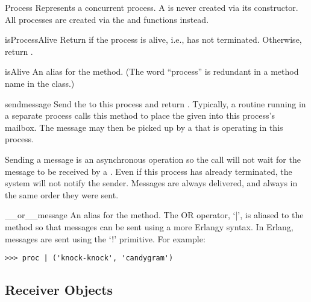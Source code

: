 \documentclass{howto}
\begin{document}
\begin{classdesc}{Process}{}
Represents a concurrent process. A  is never created via its
constructor. All processes are created via the  and
 functions instead.

\begin{methoddesc}{isProcessAlive}{}
Return  if the process is alive, i.e., has not terminated.
Otherwise, return .
\end{methoddesc}

\begin{methoddesc}{isAlive}{}
An alias for the  method. (The word ``process'' is
redundant in a method name in the  class.)
\end{methoddesc}

\begin{methoddesc}{send}{message}
Send the  to this process and return . Typically, a
routine running in a separate process calls this method to place the given
 into this process's mailbox. The message may then be picked up
by a  that is operating in this process.

Sending a message is an asynchronous operation so the  call will
not wait for the message to be received by a . Even if this
process has already terminated, the system will not notify the sender. Messages
are always delivered, and always in the same order they were sent.
\end{methoddesc}

\begin{methoddesc}{__or__}{message}
An alias for the  method. The OR operator, `|', is aliased to
the  method so that messages can be sent using a more Erlangy
syntax. In Erlang, messages are sent using the `!' primitive. For example:
\begin{verbatim}
>>> proc | ('knock-knock', 'candygram')
\end{verbatim}
\end{methoddesc}

\end{classdesc}



\subsection{Receiver Objects}
\label{Receiver}
\end{document}
